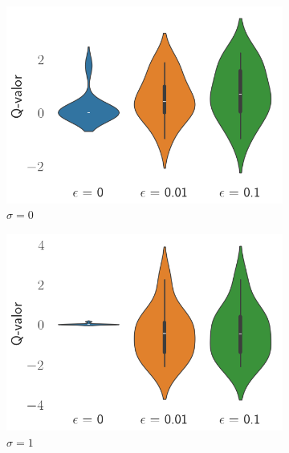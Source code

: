 \documentclass[12pt]{article}
\begin{document}
    \begin{figure}[H]
        \centering

        \begin{subfigure}[H]{0.3\textwidth}
            \includegraphics[width=\textwidth]{../img/2000/values_sigma_0}
            \caption{$\sigma=0$}
            \label{fig:estimations_0}
        \end{subfigure}
        \begin{subfigure}[H]{0.3\textwidth}
            \includegraphics[width=\textwidth]{../img/2000/values_sigma_1}
            \caption{$\sigma=1$}
            \label{fig:estimations_1}
        \end{subfigure}
        \begin{subfigure}[H]{0.3\textwidth}

\end{subfigure}
\end{figure}
\end{document}
